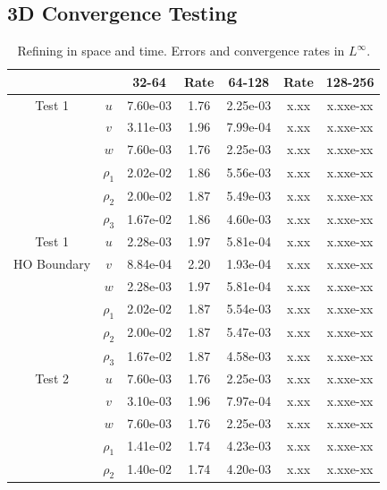 \documentclass[final]{siamltex}
\begin{document}
\subsection{3D Convergence Testing}

\begin{table}[h]
\begin{center}
\caption{Refining in space and time.  Errors and convergence rates in $L^\infty$.}
\label{tab:Linf_3d}
\begin{tabular}{ccccccc}
& & 32-64 & Rate & 64-128 & Rate & 128-256 \\
\hline
Test 1              & $u$      & 7.60e-03 & 1.76 & 2.25e-03 & x.xx & x.xxe-xx \\
                    & $v$      & 3.11e-03 & 1.96 & 7.99e-04 & x.xx & x.xxe-xx \\
                    & $w$      & 7.60e-03 & 1.76 & 2.25e-03 & x.xx & x.xxe-xx \\
                    & $\rho_1$ & 2.02e-02 & 1.86 & 5.56e-03 & x.xx & x.xxe-xx \\
                    & $\rho_2$ & 2.00e-02 & 1.87 & 5.49e-03 & x.xx & x.xxe-xx \\
                    & $\rho_3$ & 1.67e-02 & 1.86 & 4.60e-03 & x.xx & x.xxe-xx \\
\hline
Test 1              & $u$      & 2.28e-03 & 1.97 & 5.81e-04 & x.xx & x.xxe-xx \\
HO Boundary         & $v$      & 8.84e-04 & 2.20 & 1.93e-04 & x.xx & x.xxe-xx \\
                    & $w$      & 2.28e-03 & 1.97 & 5.81e-04 & x.xx & x.xxe-xx \\
                    & $\rho_1$ & 2.02e-02 & 1.87 & 5.54e-03 & x.xx & x.xxe-xx \\
                    & $\rho_2$ & 2.00e-02 & 1.87 & 5.47e-03 & x.xx & x.xxe-xx \\
                    & $\rho_3$ & 1.67e-02 & 1.87 & 4.58e-03 & x.xx & x.xxe-xx \\
\hline
Test 2              & $u$      & 7.60e-03 & 1.76 & 2.25e-03 & x.xx & x.xxe-xx \\
                    & $v$      & 3.10e-03 & 1.96 & 7.97e-04 & x.xx & x.xxe-xx \\
                    & $w$      & 7.60e-03 & 1.76 & 2.25e-03 & x.xx & x.xxe-xx \\
                    & $\rho_1$ & 1.41e-02 & 1.74 & 4.23e-03 & x.xx & x.xxe-xx \\
                    & $\rho_2$ & 1.40e-02 & 1.74 & 4.20e-03 & x.xx & x.xxe-xx \\

\end{tabular}
\end{center}
\end{table}
\end{document}

